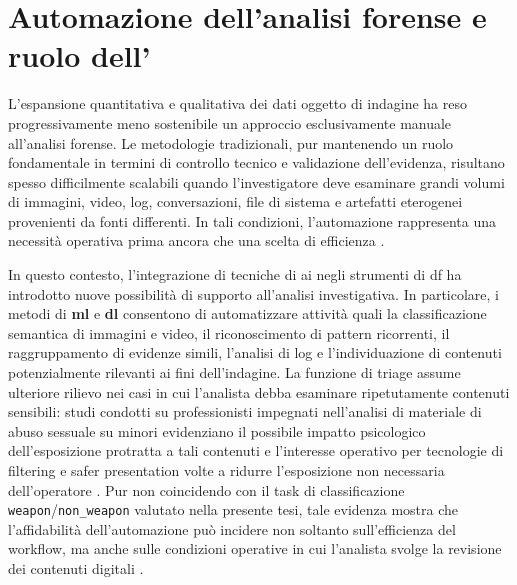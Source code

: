 \section[Automazione dell'analisi forense e ruolo dell'AI]{Automazione dell'analisi forense e ruolo dell'}
L'espansione quantitativa e qualitativa dei dati oggetto di indagine ha reso progressivamente meno sostenibile un approccio esclusivamente manuale all'analisi forense. Le metodologie tradizionali, pur mantenendo un ruolo fondamentale in termini di controllo tecnico e validazione dell'evidenza, risultano spesso difficilmente scalabili quando l'investigatore deve esaminare grandi volumi di immagini, video, log, conversazioni, file di sistema e artefatti eterogenei provenienti da fonti differenti. In tali condizioni, l'automazione rappresenta una necessità operativa prima ancora che una scelta di efficienza \cite{garfinkel2010digital,costantini2019digital}.

In questo contesto, l'integrazione di tecniche di \gls{ai} negli strumenti di \gls{df} ha introdotto nuove possibilità di supporto all'analisi investigativa. In particolare, i metodi di \textbf{\gls{ml}} e \textbf{\gls{dl}} consentono di automatizzare attività quali la classificazione semantica di immagini e video, il riconoscimento di pattern ricorrenti, il raggruppamento di evidenze simili, l'analisi di log e l'individuazione di contenuti potenzialmente rilevanti ai fini dell'indagine. La funzione di triage assume ulteriore rilievo nei casi in cui l'analista debba esaminare ripetutamente contenuti sensibili: studi condotti su professionisti impegnati nell'analisi di materiale di abuso sessuale su minori evidenziano il possibile impatto psicologico dell'esposizione protratta a tali contenuti e l'interesse operativo per tecnologie di filtering e safer presentation volte a ridurre l'esposizione non necessaria dell'operatore \cite{sanchez2019practitioner}. Pur non coincidendo con il task di classificazione \texttt{weapon}/\texttt{non\_weapon} valutato nella presente tesi, tale evidenza mostra che l'affidabilità dell'automazione può incidere non soltanto sull'efficienza del workflow, ma anche sulle condizioni operative in cui l'analista svolge la revisione dei contenuti digitali \cite{costantini2019digital,sanna2024preliminary}.

